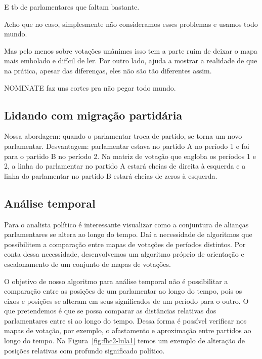 \documentclass[a4paper, 12pt]{article}
\newcommand\todo[1]{\nb{ToDo}{#1}}
\newcommand\nominate{NOMINATE\xspace}
\begin{document}
E tb de parlamentares que faltam bastante.

Acho que no caso, simplesmente não consideramos esses problemas e usamos todo mundo.

Mas pelo menos sobre votações unânimes isso tem a parte ruim de deixar o mapa mais embolado e difícil de ler. Por outro lado, ajuda a mostrar a realidade de que na prática, apesar das diferenças, eles não são tão diferentes assim.

\nominate faz uns cortes pra não pegar todo mundo.

\subsection*{Lidando com migração partidária}

Nossa abordagem: quando o parlamentar troca de partido, se torna um novo parlamentar. Desvantagem: parlamentar estava no partido A no período 1 e foi para o partido B no período 2. Na matriz de votação que engloba os períodos 1 e 2, a linha do parlamentar no partido A estará cheias de direita à esquerda e a linha do parlamentar no partido B estará cheias de zeros à esquerda.

\todo{Citar Izumi}

\subsection*{Análise temporal}

Para o analista político é interessante visualizar como a conjuntura de alianças parlamentares se altera ao longo do tempo. Daí a necessidade de algoritmos que possibilitem a comparação entre mapas de votações de períodos distintos. Por conta dessa necessidade, desenvolvemos um algoritmo próprio de orientação e escalonamento de um conjunto de mapas de votações.

O objetivo de nosso algoritmo para análise temporal não é possibilitar a comparação entre as posições de um parlamentar ao longo do tempo, pois os eixos e posições se alteram em seus significados de um período para o outro. O que pretendemos é que se possa comparar as distâncias relativas dos parlamentares entre si ao longo do tempo. Dessa forma é possível verificar nos mapas de votação, por exemplo, o afastamento e aproximação entre partidos ao longo do tempo. Na Figura~\ref{fig:fhc2-lula1} temos um exemplo de alteração de posições relativas com profundo significado político. \\
\end{document}
